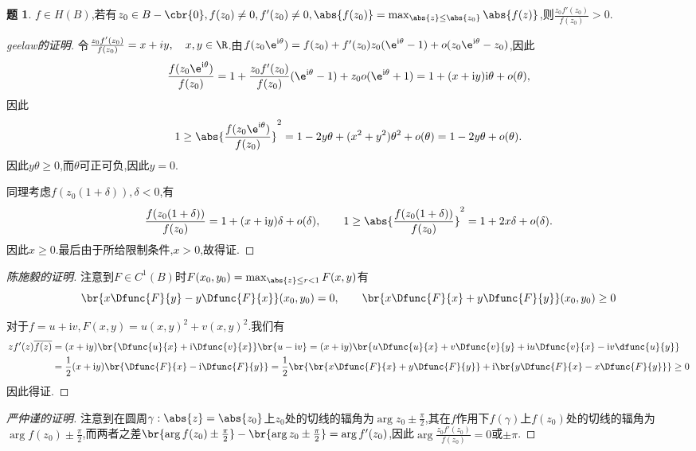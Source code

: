 \documentclass{article}
\renewcommand{\i}{\mathrm{i}}
\theoremstyle{definition}
\newtheorem{exercise}{题}[section]
\begin{document}
\begin{exercise}
    $f\in H(B)$,若有$z_0\in B-\cbr{0}, f(z_0)\neq 0, f'(z_0)\neq 0, \abs{f(z_0)}=\max_{\abs{z}\leq \abs{z_0}}\abs{f(z)}$,则$\frac{z_0f'(z_0)}{f(z_0)}>0$.
\end{exercise}
\begin{proof}[geelaw的证明]
    令$\frac{z_0 f'(z_0)}{f(z_0)}=x+iy,\quad x,y\in\R$.由$f(z_0\e^{\i\theta})=f(z_0)+f'(z_0)z_0(\e^{\i\theta}-1)+o(z_0\e^{\i\theta}-z_0)$,因此
    $$\frac{f(z_0\e^{\i\theta})}{f(z_0)}=1+\frac{z_0f'(z_0)}{f(z_0)}(\e^{\i\theta}-1)+z_0o(\e^{\i\theta}+1)=1+(x+\i y)\i \theta+o(\theta),$$
    因此$$1\geq \abs{\frac{f(z_0\e^{\i\theta})}{f(z_0)}}^2=1-2y\theta+(x^2+y^2)\theta^2+o(\theta)=1-2y\theta+o(\theta).$$
    因此$y\theta\geq 0$,而$\theta$可正可负,因此$y=0$.

    同理考虑$f(z_0(1+\delta)),\delta<0$,有
    $$\frac{f(z_0(1+\delta))}{f(z_0)}=1+(x+\i y)\delta+o(\delta),\qquad 1\geq \abs{\frac{f(z_0(1+\delta))}{f(z_0)}}^2=1+2x\delta+o(\delta).$$
    因此$x\geq 0$.最后由于所给限制条件,$x>0$,故得证.
\end{proof}
\begin{proof}[陈施毅的证明]
    注意到$F\in C^1(B)$时$F(x_0,y_0)=\max_{\abs{z}\leq r<1}F(x,y)$有
    $$\br{x\Dfunc{F}{y}-y\Dfunc{F}{x}}(x_0,y_0)=0,\qquad \br{x\Dfunc{F}{x}+y\Dfunc{F}{y}}(x_0,y_0)\geq 0$$

    对于$f=u+\i v, F(x,y)=u(x,y)^2+v(x,y)^2$.我们有
    $$\begin{aligned}
        zf'(z)\overline{f(z)}&=(x+\i y)\br{\Dfunc{u}{x}+\i\Dfunc{v}{x}}\br{u-\i v}=(x+\i y)\br{u\Dfunc{u}{x}+v\Dfunc{v}{y}+\i u\Dfunc{v}{x}-\i v\dfunc{u}{y}}\\
        &=\frac{1}{2}(x+\i y)\br{\Dfunc{F}{x}-\i\Dfunc{F}{y}}=\frac{1}{2}\br{\br{x\Dfunc{F}{x}+y\Dfunc{F}{y}}+\i\br{y\Dfunc{F}{x}-x\Dfunc{F}{y}}}\geq 0
    \end{aligned}$$
    因此得证.
\end{proof}
\begin{proof}[严仲谨的证明]
    注意到在圆周$\gamma:\abs{z}=\abs{z_0}$上$z_0$处的切线的辐角为$\arg z_0\pm\frac{\pi}{2}$,其在$f$作用下$f(\gamma)$上$f(z_0)$处的切线的辐角为$\arg f(z_0)\pm\frac{\pi}{2}$,而两者之差$\br{\arg f(z_0)\pm\frac{\pi}{2}}-\br{\arg z_0\pm\frac{\pi}{2}}=\arg f'(z_0)$,因此$\arg \frac{z_0f'(z_0)}{f(z_0)}=0$或$\pm\pi$.
    
    \tbc
\end{proof}
\end{document}

